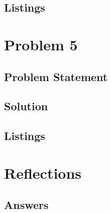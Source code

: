 \documentclass[12pt,a4paper,titlepage,oneside]{article}
\begin{document}
\subsection{Listings}

\newpage
\section{Problem 5}

\subsection{Problem Statement}


\subsection{Solution}

\subsection{Listings}

\newpage
\section{Reflections}



\subsection{Answers}
\end{document}
